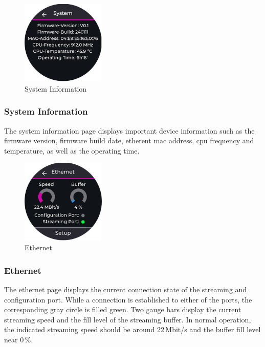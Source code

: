 \begin{minipage}{\linewidth}
	\begin{figure}
		\vspace{-0.6cm}
		\includegraphics[width=4cm]{images/6_design_final/gui/03_system_info.png}
		\centering
		\caption{System Information}
		\label{fig:final_design_gui_system_info}
	\end{figure}
	\subsubsection{System Information}
	The system information page displays important device information such as the firmware version,
	firmware build date, etherent \acrshort{mac} address, \acrshort{cpu} frequency and temperature, as well as the operating time.
\end{minipage}
\vspace{1.3cm}

\begin{minipage}{\linewidth}
	\begin{figure}
		\vspace{-0.6cm}
		\includegraphics[width=4cm]{images/6_design_final/gui/04_ethernet.png}
		\centering
		\caption{Ethernet}
		\label{fig:final_design_gui_ethernet}
	\end{figure}
	\subsubsection{Ethernet}
	The ethernet page displays the current connection state of the streaming and configuration port.
	While a connection is established to either of the ports, the corresponding gray circle is filled green.
	Two gauge bars display the current streaming speed and the fill level of the streaming buffer.
	In normal operation, the indicated streaming speed should be around 22\,Mbit/s and the buffer fill level near 0\,\%.
\end{minipage}
\vspace{0.0cm}

